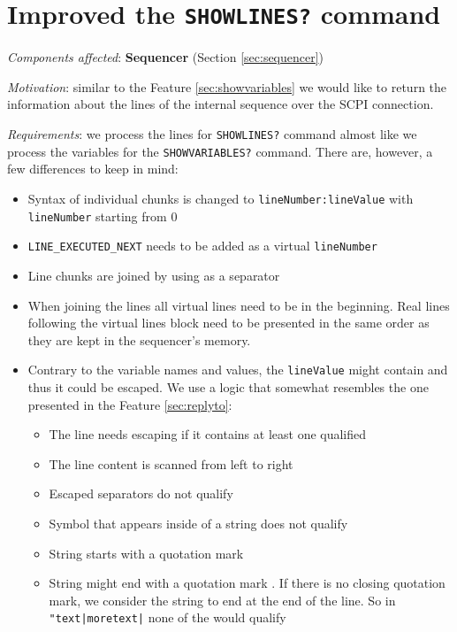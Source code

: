\section{Improved the \texttt{SHOWLINES?} command}
\label{sec:showlines}

\textit{Components affected}: \textbf{Sequencer} (Section \ref{sec:sequencer})

\textit{Motivation}: similar to the Feature \ref{sec:showvariables} we would like to return the information about the lines of the internal sequence over the SCPI connection.

\textit{Requirements}: we process the lines for \texttt{SHOWLINES?} command almost like we process the variables for the \texttt{SHOWVARIABLES?} command. There are, however, a few differences to keep in mind:

\begin{itemize}
	\item Syntax of individual chunks is changed to \texttt{lineNumber:lineValue} with \texttt{lineNumber} starting from 0
	\item \texttt{LINE\_EXECUTED\_NEXT} needs to be added as a virtual \texttt{lineNumber}
	\item Line chunks are joined by using \highlight{|} as a separator
	\item When joining the lines all virtual lines need to be in the beginning. Real lines following the virtual lines block need to be presented in the same order as they are kept in the sequencer's memory.
	\item{
		Contrary to the variable names and values, the \texttt{lineValue} might contain \highlight{|} and thus it could be escaped. We use a logic that somewhat resembles the one presented in the Feature \ref{sec:replyto}:
		\begin{itemize}
			\item The line needs escaping if it contains at least one qualified \highlight{|}
			\item The line content is scanned from left to right		
			\item Escaped separators \highlight{\textbackslash |} do not qualify
			\item Symbol \highlight{|} that appears inside of a string does not qualify
			\item String starts with a quotation mark 
			\item String might end with a quotation mark . If there is no closing quotation mark, we consider the string to end at the end of the line. So in \texttt{"text|moretext|} none of the \highlight{|} would qualify

\end{itemize}}
\end{itemize}
